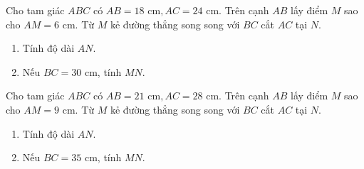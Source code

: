 \begin{bt}%
	Cho tam giác $ABC$ có $AB=18\text{ cm}, AC=24\text{ cm}$. Trên cạnh $AB$ lấy điểm $M$ sao cho $AM=6\text{ cm}$. Từ $M$ kẻ đường thẳng song song với $BC$ cắt $AC$ tại $N$.
	\begin{enumerate}
		\item Tính độ dài $AN$.
		\item Nếu $BC=30\text{ cm}$, tính $MN$.
	\end{enumerate}
\end{bt}

\begin{bt}%
	Cho tam giác $ABC$ có $AB=21\text{ cm}, AC=28\text{ cm}$. Trên cạnh $AB$ lấy điểm $M$ sao cho $AM=9\text{ cm}$. Từ $M$ kẻ đường thẳng song song với $BC$ cắt $AC$ tại $N$.
	\begin{enumerate}
		\item Tính độ dài $AN$.
		\item Nếu $BC=35\text{ cm}$, tính $MN$.
	\end{enumerate}
\end{bt}

